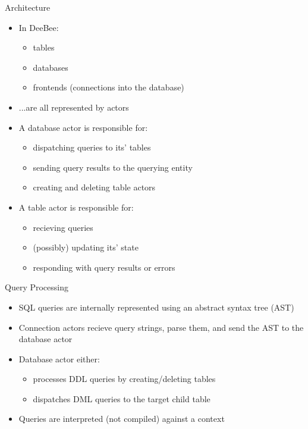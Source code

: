 \documentclass{beamer}
\begin{document}
\begin{frame}{Architecture}
  \begin{itemize}
    \item In DeeBee: \pause
    \begin{itemize}
      \item tables 
      \item databases 
      \item frontends (connections into the database)  \pause
    \end{itemize}
    \item ...are all represented by actors  \pause
    \item A database actor is responsible for:  \pause
    \begin{itemize}
      \item dispatching queries to its' tables  \pause
      \item sending query results to the querying entity  \pause
      \item creating and deleting table actors  \pause
  \end{itemize}
    \item A table actor is responsible for:  \pause
    \begin{itemize}
      \item recieving queries  \pause
      \item (possibly) updating its' state  \pause
      \item responding with query results or errors 
    \end{itemize}
  \end{itemize}
\end{frame}

\begin{frame}{Query Processing}
\begin{itemize}
  \item SQL queries are internally represented using an \alert{abstract syntax tree} (AST)  \pause
  \item Connection actors recieve \alert{query strings}, parse them, and send the AST to the database actor  \pause
  \item Database actor either:  \pause
    \begin{itemize}
      \item processes DDL queries by creating/deleting tables  \pause
      \item dispatches DML queries to the target child table  \pause
    \end{itemize}
    \item Queries are \alert{interpreted} (not compiled) against a context 
\end{itemize}
\end{frame}
\end{document}
